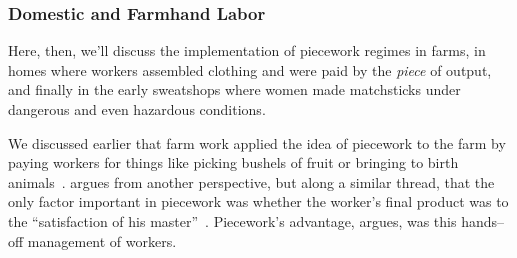 \documentclass[trackingWork]{subfiles}
\begin{document}



\subsubsection{Domestic and Farmhand Labor}

\begin{comment}
What did I pull from the threads that are related to domestic/farmwork?

- Graves: sparks of Scientific Management in Piecework, especially starting here
- 19th century: piecework was mostly cottage industry with untrained or informally trained workers
  (unlike industrial metal workers during WWII)
- Brown: Task variability matters
- Clark: pieceworkers work harder, more diligently, etc...
- Riis saw terrible conditions, documented and communicated it to the world

\end{comment}

Here, then, we'll discuss the implementation of piecework regimes in farms,
in homes where workers assembled clothing and were paid by the \textit{piece} of output, and
finally in the early sweatshops where women made matchsticks under dangerous and even hazardous conditions.

We discussed earlier that farm work applied the idea of piecework to the farm by
paying workers for things like picking bushels of fruit or bringing to birth animals~\cite{10.2307/2338394}.
\citeauthor{hughRaynbirdTaskWork} argues from another perspective, but along a similar thread, that
the only factor important in piecework was
whether the worker's final product was to the ``satisfaction of his master''~\cite{hughRaynbirdTaskWork}.
Piecework's advantage,
\citeauthor{hughRaynbirdTaskWork} argues,
was this hands--off management of workers.
\end{document}
